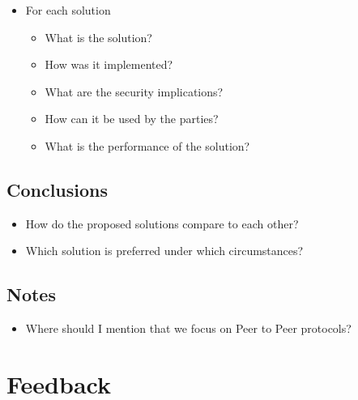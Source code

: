 \begin{itemize}
\tightlist
\item
  For each solution

  \begin{itemize}
  \tightlist
  \item
    What is the solution?
  \item
    How was it implemented?
  \item
    What are the security implications?
  \item
    How can it be used by the parties?
  \item
    What is the performance of the solution?
  \end{itemize}
\end{itemize}

\section{Conclusions}\label{notes__06000-thesis.md__conclusions}

\begin{itemize}
\tightlist
\item
  How do the proposed solutions compare to each other?
\item
  Which solution is preferred under which circumstances?
\end{itemize}

\label{notes__07000-general.md}
\section{Notes}\label{notes__07000-general.md__notes}

\begin{itemize}
\tightlist
\item
  Where should I mention that we focus on Peer to Peer protocols?
\end{itemize}

\label{notes__08000-feedback.md}
\chapter{Feedback}\label{notes__08000-feedback.md__feedback}

